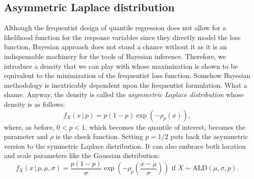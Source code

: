 \documentclass[12pt]{article}
\begin{document}
\subsection{Asymmetric Laplace distribution}
Although the frequentist design of quantile regression does not allow for a likelihood function for the response variables since they directly model the loss function, Bayesian approach does not stand a chance without it as it is an indispensable machinery for the tools of Bayesian inference. Therefore, we introduce a density that we can play with whose maximization is shown to be equivalent to the minimization of the frequentist loss function. Somehow Bayesian methodology is inextricably dependent upon the frequentist formulation. What a shame. Anyway, the density is called the \emph{asymmetric Laplace distribution} whose density is as follows:
\begin{equation}
  f_{X}\left(x\,|\,p\right) = p\left(1-p\right)\exp\left(-\rho_{p}\left(x\right)\right),
\end{equation}
where, as before, $0<p<1$, which becomes the quantile of interest, becomes the parameter and $\rho$ is the check function. Setting $p = 1/2$ puts back the asymmetric version to the symmetric Laplace distribution. It can also embrace both location and scale parameters like the Gaussian distribution:
\begin{equation}
  f_{X}\left(x\,|\,p,\mu,\sigma\right) = \frac{p\left(1-p\right)}{\sigma}\exp\left(-\rho_{p}\left(\frac{x-\mu}{\sigma}\right)\right)\text{ if $X \sim \mathrm{ALD}\left(\mu,\sigma,p \right)$}.
\end{equation}
\end{document}
